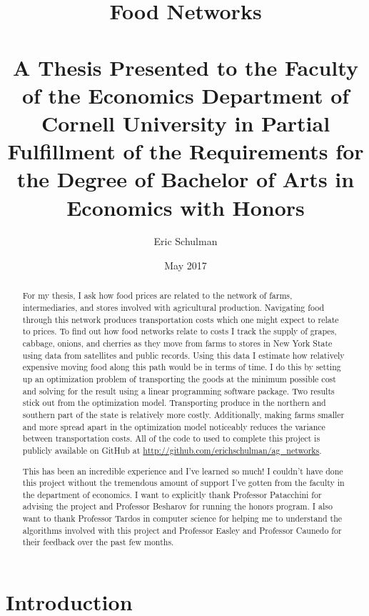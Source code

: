 \documentclass{report}
\title{Food Networks \\~\\ \normalsize A Thesis Presented to the Faculty of the Economics Department of Cornell University in Partial Fulfillment of the Requirements for the Degree of Bachelor of Arts in Economics with Honors}
\author{Eric Schulman}
\date{May 2017}
\begin{document}
\maketitle

\pagebreak

\begin{abstract}
For my thesis, I ask how food prices are related to the network of farms, intermediaries, and stores involved with agricultural production. Navigating food through this network produces transportation costs which one might expect to relate to prices.  To find out how food networks relate to costs I track the supply of grapes, cabbage, onions, and cherries as they move from farms to stores in New York State using data from satellites and public records. Using this data I estimate how relatively expensive moving food along this path would be in terms of time. I do this by setting up an optimization problem of transporting the goods at the minimum possible cost and solving for the result using a linear programming software package. Two results stick out from the optimization model. Transporting produce in the northern and southern part of the state is relatively more costly. Additionally, making farms smaller and more spread apart in the optimization model noticeably reduces the variance between transportation costs. All of the code to used to complete this project is publicly available on GitHub at \url{http://github.com/erichschulman/ag_networks}. 
\end{abstract}

\pagebreak

\renewcommand{\abstractname}{Acknowledgments}
\begin{abstract}
This has been an incredible experience and I've learned so much! I couldn't have done this project without the tremendous amount of support I've gotten from the faculty in the department of economics. I want to explicitly thank Professor Patacchini for advising the project and Professor Besharov for running the honors program. I also want to thank Professor Tardos in computer science for helping me to understand the algorithms involved with this project and Professor Easley and Professor Caunedo for their feedback over the past few months. 
\end{abstract}

\tableofcontents

\chapter{Introduction}
\end{document}
